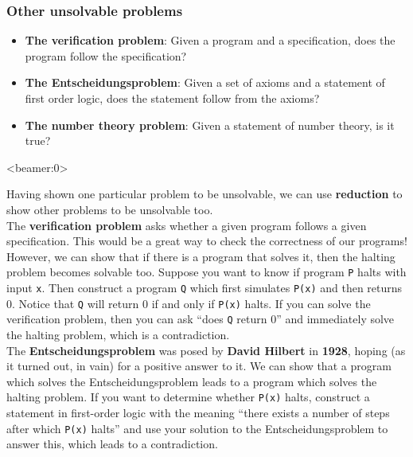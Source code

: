 \documentclass[handout, 12pt]{beamer}
\begin{document}
\begin{frame}

\frametitle{Other unsolvable problems}

\begin{itemize}
\addtolength{\itemsep}{1\baselineskip}
\pause\item \textbf{The verification problem}: Given a program and a specification, does the program follow the specification?
\pause\item \textbf{The Entscheidungsproblem}: Given a set of axioms and a statement of first order logic, does the statement follow from the axioms?
\pause\item \textbf{The number theory problem}: Given a statement of number theory, is it true?
\end{itemize}

\end{frame}

\begin{frame}<beamer:0>

\footnotesize
Having shown one particular problem to be unsolvable, we can use \textbf{reduction} to show other problems to be unsolvable too.
\\[0.6em]
The \textbf{verification problem} asks whether a given program follows a given specification. This would be a great way to check the correctness of our programs! However, we can show that if there is a program that solves it, then the halting problem becomes solvable too. Suppose you want to know if program \texttt{P} halts with input \texttt{x}. Then construct a program \texttt{Q} which first simulates \texttt{P(x)} and then returns $0$. Notice that \texttt{Q} will return $0$ if and only if \texttt{P(x)} halts. If you can solve the verification problem, then you can ask ``does \texttt{Q} return $0$'' and immediately solve the halting problem, which is a contradiction.
\\[0.6em]
The \textbf{Entscheidungsproblem} was posed by \textbf{David Hilbert} in \textbf{1928}, hoping (as it turned out, in vain) for a positive answer to it. We can show that a program which solves the Entscheidungsproblem leads to a program which solves the halting problem. If you want to determine whether \texttt{P(x)} halts, construct a statement in first-order logic with the meaning ``there exists a number of steps after which \texttt{P(x)} halts'' and use your solution to the Entscheidungsproblem to answer this, which leads to a contradiction.

\end{frame}
\end{document}
